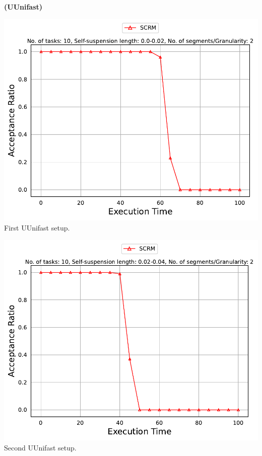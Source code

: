 \documentclass[]{article}
\begin{document}
	\begin{minipage}[t]{0.48\linewidth}
		\centering
		\textbf{(UUnifast)}
		\vspace{0.3cm}
		
		\includegraphics[width=\linewidth]{SCRM[2][0.0-0.02][10].pdf}
		First UUnifast setup.
		\vspace{0.3cm}
		
		\includegraphics[width=\linewidth]{SCRM[2][0.02-0.04][10].pdf}
		Second UUnifast setup.
		\vspace{0.3cm}
		

\end{minipage}
\end{document}
